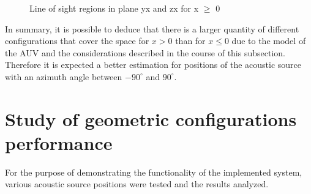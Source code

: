 \begin{figure}[!htbp]
	\captionsetup{justification=centering,margin=2cm}
	\caption{Line of sight regions in plane yx and zx for x $\geq$ 0}
	\label{fig:los-color-b0}
\end{figure}

In summary, it is possible to deduce that there is a larger quantity of different configurations that cover the space for $x>0$ than for $x \leq 0$ due to the model of the AUV and the considerations described in the course of this subsection. Therefore it is expected a better estimation for positions of the acoustic source with an azimuth angle between $-90^{\circ}$ and $90^{\circ}$.


\section{Study of geometric configurations performance} \label{sec:analysis_config_performance}


For the purpose of demonstrating the functionality of the implemented system, various acoustic source positions were tested and the results analyzed.

